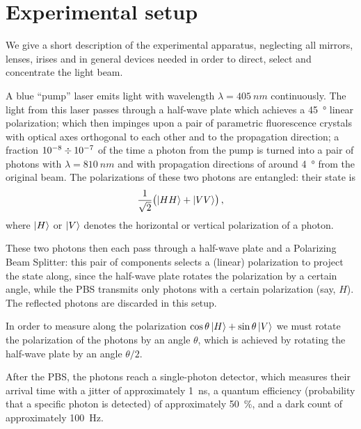 \documentclass[main.tex]{subfiles}
\begin{document}
\section{Experimental setup}


We give a short description of the experimental apparatus, neglecting all mirrors, lenses, irises and in general devices needed in order to direct, select and concentrate the light beam.

A blue ``pump'' laser emits light with wavelength \(\lambda = \SI{405}{nm}\) continuously.
The light from this laser passes through a half-wave plate which achieves a \SI{45}{\degree} linear polarization;
which then impinges upon a pair of parametric fluorescence crystals with optical axes orthogonal to each other and to the propagation direction;
a fraction \(\num{e-8}\divisionsymbol \num{e-7} \) of the time a photon from the pump is turned into a pair of photons with \(\lambda = \SI{810}{nm}\) and with propagation directions of around \SI{4}{\degree} from the original beam. 
The polarizations of these two photons are entangled: their state is 
%
\begin{align} \label{eq:epr-state}
\frac{1}{\sqrt{2}} \qty(\ket{HH} + \ket{VV})
\,,
\end{align}
%
where \(\ket{H}\) or \(\ket{V}\) denotes the horizontal or vertical polarization of a photon. 

These two photons then each pass through a half-wave plate and a Polarizing Beam Splitter: this pair of components selects a (linear) polarization to project the state along, since the half-wave plate rotates the polarization by a certain angle, while the PBS transmits only photons with a certain polarization (say, \(H\)).
The reflected photons are discarded in this setup. 

In order to measure along the polarization \(\cos \theta \ket{H} + \sin \theta \ket{V}\) we must rotate the polarization of the photons by an angle \(\theta \), which is achieved by rotating the half-wave plate by an angle \(\theta /2\). 

After the PBS, the photons reach a single-photon detector, which measures their arrival time with a jitter of approximately \SI{1}{ns}, a quantum efficiency (probability that a specific photon is detected) of approximately \SI{50}{\percent}, and a dark count of approximately \SI{100}{Hz}. 
\end{document}

